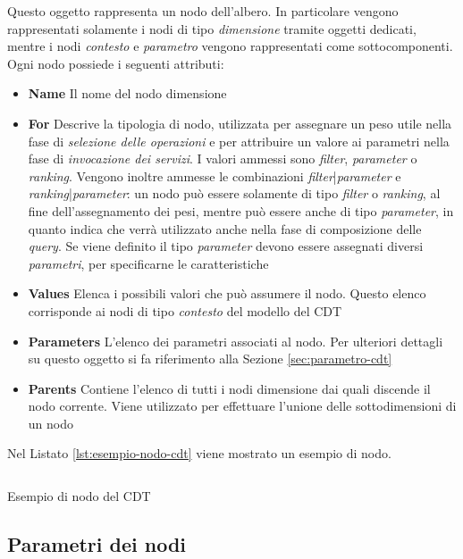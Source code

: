 Questo oggetto rappresenta un nodo dell'albero. In particolare vengono rappresentati solamente i nodi di tipo \emph{dimensione} tramite oggetti dedicati, mentre i nodi \emph{contesto} e \emph{parametro} vengono rappresentati come sottocomponenti. Ogni nodo possiede i seguenti attributi:

\begin{itemize}
	\item \textbf{Name}
	Il nome del nodo dimensione
	\item \textbf{For}
	Descrive la tipologia di nodo, utilizzata per assegnare un peso utile nella fase di \emph{selezione delle operazioni} e per attribuire un valore ai parametri nella fase di \emph{invocazione dei servizi}. I valori ammessi sono \emph{filter}, \emph{parameter} o \emph{ranking}. Vengono inoltre ammesse le combinazioni \emph{filter}|\emph{parameter} e \emph{ranking}|\emph{parameter}: un nodo può essere solamente di tipo \emph{filter} o \emph{ranking}, al fine dell'assegnamento dei pesi, mentre può essere anche di tipo \emph{parameter}, in quanto indica che verrà utilizzato anche nella fase di composizione delle \emph{query}. Se viene definito il tipo \emph{parameter} devono essere assegnati diversi \emph{parametri}, per specificarne le caratteristiche
	\item \textbf{Values}
	Elenca i possibili valori che può assumere il nodo. Questo elenco corrisponde ai nodi di tipo \emph{contesto} del modello del CDT
	\item \textbf{Parameters}
	L'elenco dei parametri associati al nodo. Per ulteriori dettagli su questo oggetto si fa riferimento alla Sezione \ref{sec:parametro-cdt}
	\item \textbf{Parents}
	Contiene l'elenco di tutti i nodi dimensione dai quali discende il nodo corrente. Viene utilizzato per effettuare l'unione delle sottodimensioni di un nodo
\end{itemize}

Nel Listato \ref{lst:esempio-nodo-cdt} viene mostrato un esempio di nodo.

\begin{listing}[H]
	\inputminted{json}{5-implementazione-backend/Codice/esempio_nodo_cdt.json}
	\caption{Esempio di nodo del CDT}
	\label{lst:esempio-nodo-cdt}
\end{listing}

\subsection{Parametri dei nodi\label{sec:parametro-cdt}}

